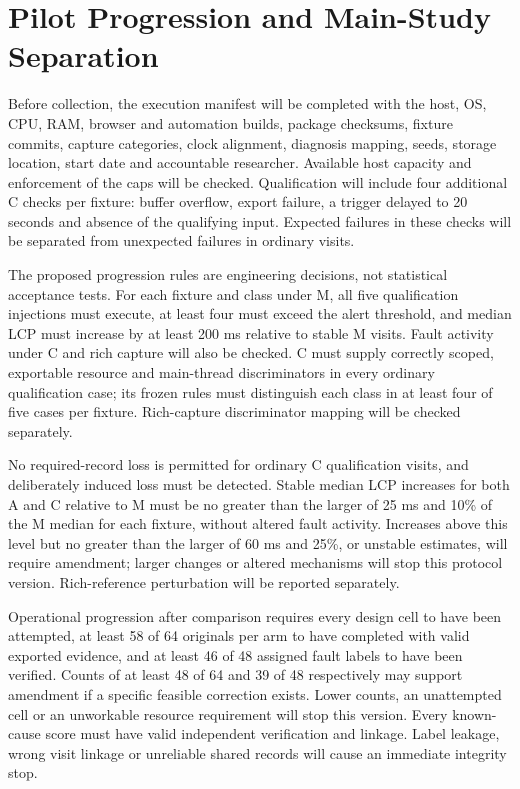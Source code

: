 \section{Pilot Progression and Main-Study Separation}
\label{sec:pilot-main}

Before collection, the execution manifest will be completed with the host, OS, CPU, RAM, browser and automation builds, package checksums, fixture commits, capture categories, clock alignment, diagnosis mapping, seeds, storage location, start date and accountable researcher. Available host capacity and enforcement of the caps will be checked. Qualification will include four additional C checks per fixture: buffer overflow, export failure, a trigger delayed to 20 seconds and absence of the qualifying input. Expected failures in these checks will be separated from unexpected failures in ordinary visits.

The proposed progression rules are engineering decisions, not statistical acceptance tests. For each fixture and class under M, all five qualification injections must execute, at least four must exceed the alert threshold, and median LCP must increase by at least 200 ms relative to stable M visits. Fault activity under C and rich capture will also be checked. C must supply correctly scoped, exportable resource and main-thread discriminators in every ordinary qualification case; its frozen rules must distinguish each class in at least four of five cases per fixture. Rich-capture discriminator mapping will be checked separately.

No required-record loss is permitted for ordinary C qualification visits, and deliberately induced loss must be detected. Stable median LCP increases for both A and C relative to M must be no greater than the larger of 25 ms and 10\% of the M median for each fixture, without altered fault activity. Increases above this level but no greater than the larger of 60 ms and 25\%, or unstable estimates, will require amendment; larger changes or altered mechanisms will stop this protocol version. Rich-reference perturbation will be reported separately.

Operational progression after comparison requires every design cell to have been attempted, at least 58 of 64 originals per arm to have completed with valid exported evidence, and at least 46 of 48 assigned fault labels to have been verified. Counts of at least 48 of 64 and 39 of 48 respectively may support amendment if a specific feasible correction exists. Lower counts, an unattempted cell or an unworkable resource requirement will stop this version. Every known-cause score must have valid independent verification and linkage. Label leakage, wrong visit linkage or unreliable shared records will cause an immediate integrity stop.

